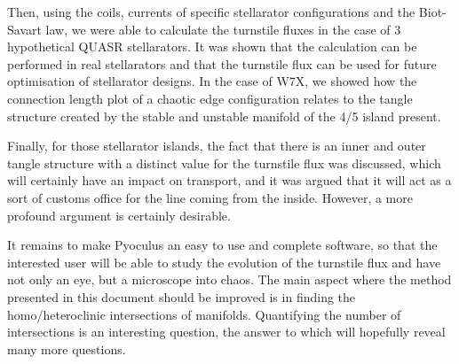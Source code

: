 Then, using the coils, currents of specific stellarator configurations and the Biot-Savart law, we were able to calculate the turnstile fluxes in the case of 3 hypothetical QUASR stellarators. It was shown that the calculation can be performed in real stellarators and that the turnstile flux can be used for future optimisation of stellarator designs. In the case of W7X, we showed how the connection length plot of a chaotic edge configuration relates to the tangle structure created by the stable and unstable manifold of the 4/5 island present.

Finally, for those stellarator islands, the fact that there is an inner and outer tangle structure with a distinct value for the turnstile flux was discussed, which will certainly have an impact on transport, and it was argued that it will act as a sort of customs office for the line coming from the inside. However, a more profound argument is certainly desirable.

It remains to make Pyoculus an easy to use and complete software, so that the interested user will be able to study the evolution of the turnstile flux and have not only an eye, but a microscope into chaos. The main aspect where the method presented in this document should be improved is in finding the homo/heteroclinic intersections of manifolds. Quantifying the number of intersections is an interesting question, the answer to which will hopefully reveal many more questions.
